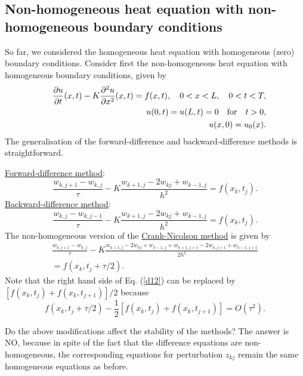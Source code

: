 %
%
%


\subsection{Non-homogeneous heat equation with non-homogeneous boundary conditions}

 
So far, we considered the homogeneous heat equation with homogeneous
(zero) boundary conditions. Consider first
the non-homogeneous heat equation with homogeneous
boundary conditions, given by
\begin{eqnarray}
&&\frac{{\partial} u}{{\partial} t}(x,t) - K\frac{{\partial}^{2} u}{{\partial} x^{2}}(x,t)=f(x,t), \quad
0<x< L, \quad 0<t<T,   \label{d1} \\
&&u(0, t) = u(L, t)=0 \quad \hbox{for} \quad t>0,   \label{d2} \\
&&u(x, 0) = u_{0}(x).   \label{d3}
\end{eqnarray}
The generalisation of the forward-difference and backward-difference methods is straightforward.


\vskip 3mm
 
\underline{Forward-difference method}:
\begin{equation}
\frac{w_{k,j+1}-w_{k,j}}{\tau}-K
\frac{w_{k+1, j}-2w_{kj}+w_{k-1,j}}{h^{2}}=f(x_k,t_j). \label{d10}
\end{equation}
\underline{Backward-difference method}:
\begin{equation}
\frac{w_{k,j}-w_{k,j-1}}{\tau}-K
\frac{w_{k+1, j}-2w_{kj}+w_{k-1,j}}{h^{2}}=f(x_k,t_j). \label{d11}
\end{equation}
The non-homogeneous version of the \underline{Crank-Nicolson method} is given
by
\begin{multline}
\frac{w_{k,j+1}-w_{k,j}}{\tau}-
K \frac{w_{k+1,j}-2w_{kj}+w_{k-1,j}+
w_{k+1,j+1}-2w_{k,j+1}+w_{k-1,j+1}}{2h^{2}}\\
=f(x_k,t_j+\tau/2). \label{d12}
\end{multline}
Note that the right hand side of Eq. (\ref{d12}) can be replaced by
$[f(x_k,t_j)+f(x_k,t_{j+1})]/2$ because
\[
f(x_k,t_j+\tau/2)-\frac{1}{2}[f(x_k,t_j)+f(x_k,t_{j+1})]=O(\tau^2).
\]

  
 
Do the above modifications affect the stability of the methods? The answer is NO, because
in spite of the fact that the difference equations are non-homogeneous, the corresponding equations for perturbation
$z_{kj}$ remain the same homogeneous equations as before.





